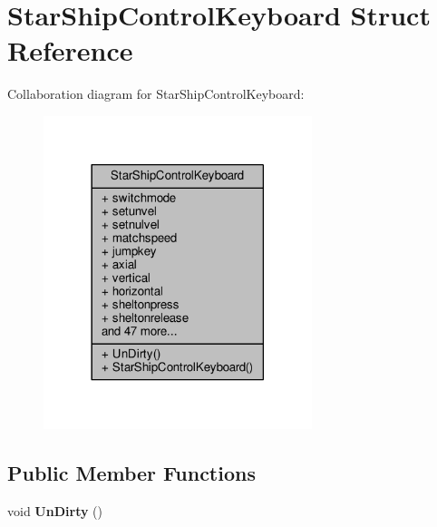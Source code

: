 \hypertarget{structStarShipControlKeyboard}{}\section{Star\+Ship\+Control\+Keyboard Struct Reference}
\label{structStarShipControlKeyboard}


Collaboration diagram for Star\+Ship\+Control\+Keyboard\+:
\nopagebreak
\begin{figure}[H]
\begin{center}
\leavevmode
\includegraphics[width=222pt]{d4/d0e/structStarShipControlKeyboard__coll__graph}
\end{center}
\end{figure}
\subsection*{Public Member Functions}
\begin{DoxyCompactItemize}
\item 
void {\bfseries Un\+Dirty} ()\hypertarget{structStarShipControlKeyboard_ab23f33fcaf6b8e365727270e97570c27}{}\label{structStarShipControlKeyboard_ab23f33fcaf6b8e365727270e97570c27}

\end{DoxyCompactItemize}
